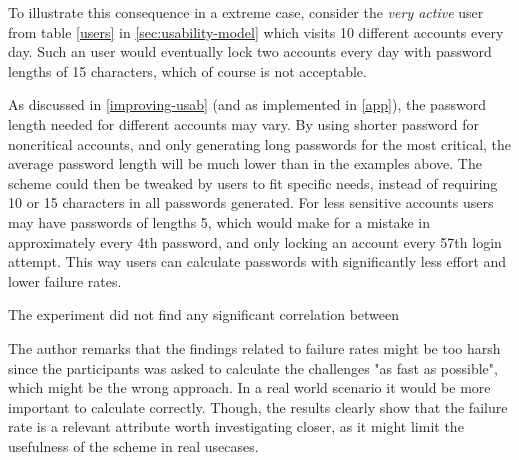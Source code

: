\par To illustrate this consequence in a extreme case, consider the \emph{very active} user from table \ref{users} in \autoref{sec:usability-model} which visits 10 different accounts every day. Such an user would eventually lock two accounts every day with password lengths of 15 characters, which of course is not acceptable.

\par As discussed in \autoref{improving-usab} (and as implemented in \autoref{app}), the password length needed for different accounts may vary. By using shorter password for noncritical accounts, and only generating long passwords for the most critical, the average password length will be much lower than in the examples above. The scheme could then be tweaked by users to fit specific needs, instead of requiring 10 or 15 characters in all passwords generated. For less sensitive accounts users may have passwords of lengths 5, which would make for a mistake in approximately every 4th password, and only locking an account every 57th login attempt. This way users can calculate passwords with significantly less effort and lower failure rates. 

\par The experiment did not find any significant correlation between 



\begin{remark}
    The author remarks that the findings related to failure rates might be too harsh since the participants was asked to calculate the challenges "as fast as possible", which might be the wrong approach. In a real world scenario it would be more important to calculate correctly. Though, the results clearly show that the failure rate is a relevant attribute worth investigating closer, as it might limit the usefulness of the scheme in real usecases.
\end{remark}



